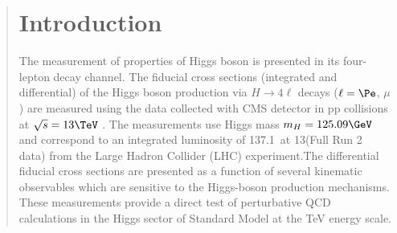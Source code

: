 \begin{abstract}
\addchaptertocentry{\abstractname} %

	\section{Introduction} \label{chinese_abstract_intro}  
	
	The measurement of properties of Higgs boson is presented in its four-lepton decay channel. The fiducial cross sections (integrated and differential) of the Higgs boson production  via $ H \to 4\ell$ decays ($\ell = \Pe$, $\mu$) are measured using the data collected with CMS detector in pp collisions at $\sqrt{s} = 13\TeV$ . The measurements use Higgs mass $m_H = 125.09\GeV$ and correspond to an integrated luminosity of 137.1~\ifb at 13\TeV (Full Run 2 data) from the Large Hadron Collider (LHC) experiment.The differential fiducial cross sections are presented as a function of several kinematic observables which are sensitive to the Higgs-boson
production mechanisms. These measurements provide a direct test of perturbative QCD  calculations in the Higgs sector of Standard Model at the TeV energy scale. 

\end{abstract}
